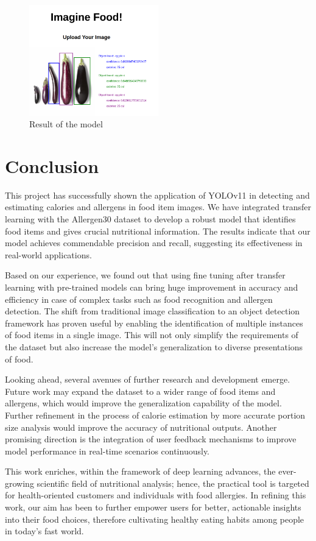 \documentclass[10pt,twocolumn,letterpaper]{article}
\begin{document}
\begin{figure}[htbp]
    \centering
    \includegraphics[width=0.5\textwidth]{advanced-detector.png}
    \caption{Result of the model}\label{advanced-client-result}
\end{figure}

\section{Conclusion}

This project has successfully shown the application of YOLOv11 in detecting and estimating calories and allergens in food item images. 
We have integrated transfer learning with the Allergen30 dataset to develop a robust model that identifies food items and gives crucial nutritional information. 
The results indicate that our model achieves commendable precision and recall, suggesting its effectiveness in real-world applications.

Based on our experience, we found out that using fine tuning after transfer learning with pre-trained models can bring huge improvement in accuracy and efficiency in case of complex tasks such as food recognition and allergen detection. 
The shift from traditional image classification to an object detection framework has proven useful by enabling the identification of multiple instances of food items in a single image. 
This will not only simplify the requirements of the dataset but also increase the model's generalization to diverse presentations of food.

Looking ahead, several avenues of further research and development emerge. 
Future work may expand the dataset to a wider range of food items and allergens, which would improve the generalization capability of the model. 
Further refinement in the process of calorie estimation by more accurate portion size analysis would improve the accuracy of nutritional outputs. 
Another promising direction is the integration of user feedback mechanisms to improve model performance in real-time scenarios continuously.

This work enriches, within the framework of deep learning advances, the ever-growing scientific field of nutritional analysis; hence, the practical tool is targeted for health-oriented customers and individuals with food allergies. 
In refining this work, our aim has been to further empower users for better, actionable insights into their food choices, therefore cultivating healthy eating habits among people in today's fast world.

{
    \small
    
    
}
\end{document}
